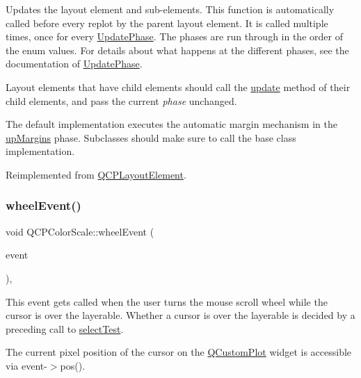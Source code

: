 Updates the layout element and sub-\/elements. This function is automatically called before every replot by the parent layout element. It is called multiple times, once for every \hyperlink{class_q_c_p_layout_element_a0d83360e05735735aaf6d7983c56374d}{Update\+Phase}. The phases are run through in the order of the enum values. For details about what happens at the different phases, see the documentation of \hyperlink{class_q_c_p_layout_element_a0d83360e05735735aaf6d7983c56374d}{Update\+Phase}.

Layout elements that have child elements should call the \hyperlink{class_q_c_p_color_scale_a259dcb6d3053a2cc3c197e9b1191ddbe}{update} method of their child elements, and pass the current {\itshape phase} unchanged.

The default implementation executes the automatic margin mechanism in the \hyperlink{class_q_c_p_layout_element_a0d83360e05735735aaf6d7983c56374da288cb59a92280e47261a341f2813e676}{up\+Margins} phase. Subclasses should make sure to call the base class implementation. 

Reimplemented from \hyperlink{class_q_c_p_layout_element_a929c2ec62e0e0e1d8418eaa802e2af9b}{Q\+C\+P\+Layout\+Element}.

\mbox{\label{class_q_c_p_color_scale_a63cf19be184f6670c9495ad3a9a1baeb}} 
\subsubsection{\texorpdfstring{wheel\+Event()}{wheelEvent()}}
{\footnotesize\ttfamily void Q\+C\+P\+Color\+Scale\+::wheel\+Event (\begin{DoxyParamCaption}\item[{Q\+Wheel\+Event $\ast$}]{event }\end{DoxyParamCaption})\hspace{0.3cm}{\ttfamily [protected]}, {\ttfamily [virtual]}}

This event gets called when the user turns the mouse scroll wheel while the cursor is over the layerable. Whether a cursor is over the layerable is decided by a preceding call to \hyperlink{class_q_c_p_layout_element_ae97f483cccedadbf18ea4525ef240ee4}{select\+Test}.

The current pixel position of the cursor on the \hyperlink{class_q_custom_plot}{Q\+Custom\+Plot} widget is accessible via {\ttfamily event-\/$>$pos()}.

